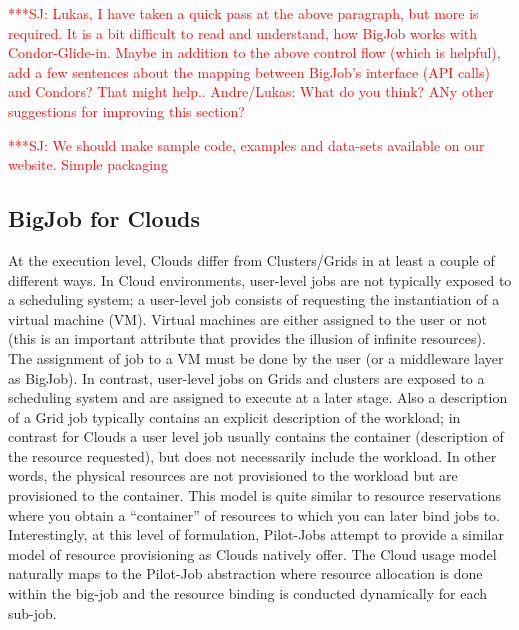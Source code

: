 \documentclass[conference,final]{IEEEtran}
\newcommand{\up}{\vspace*{-1em}}
\newcommand{\jhanote}[1]{ {\textcolor{red} { ***SJ: #1 }}}
\newcommand{\jhanote}[1]{}
\begin{document}

\jhanote{Lukas, I have taken a quick pass at the above paragraph, but
  more is required. It is a bit difficult to read and understand, how
  BigJob works with Condor-Glide-in. Maybe in addition to the above
  control flow (which is helpful), add a few sentences about the
  mapping between BigJob's interface (API calls) and Condors? That
  might help.. Andre/Lukas: What do you think? ANy other suggestions
  for improving this section?}

\jhanote{We should make sample code, examples and data-sets available
  on our website. Simple packaging}

\subsection{BigJob for Clouds}
\up


At the execution level, Clouds differ from Clusters/Grids in at least
a couple of different ways. In Cloud environments, user-level jobs are
not typically exposed to a scheduling system; a user-level job
consists of requesting the instantiation of a virtual machine (VM).
Virtual machines are either assigned to the user or not (this is an
important attribute that provides the illusion of infinite resources).
The assignment of job to a VM must be done by the user (or a
middleware layer as BigJob).  In contrast, user-level jobs on Grids
and clusters are exposed to a scheduling system and are assigned to
execute at a later stage.  Also a description of a Grid job
typically contains an explicit description of the workload; in contrast
for Clouds a user level job usually contains the container
(description of the resource requested), but does not necessarily
include the workload. In other words, the physical resources are not
provisioned to the workload but are provisioned to the container.
This model is quite similar to resource reservations where you obtain
a ``container'' of resources to which you can later bind jobs
to. Interestingly, at this level of formulation, Pilot-Jobs attempt to
provide a similar model of resource provisioning as Clouds natively
offer. The Cloud usage model naturally maps to the Pilot-Job abstraction 
where resource allocation is done within the big-job and the resource 
binding is conducted dynamically for each sub-job.
\end{document}
